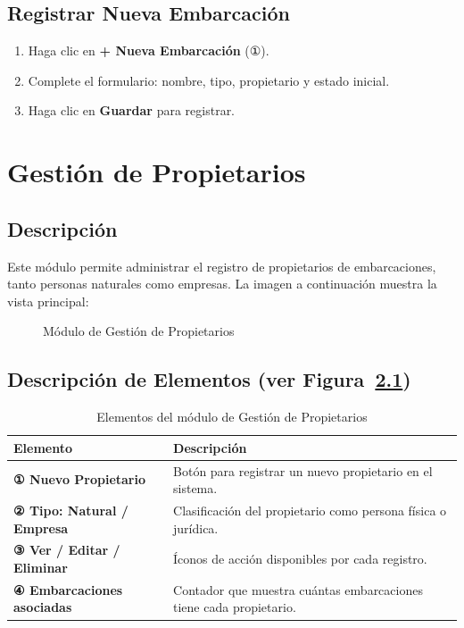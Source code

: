 \documentclass[12pt,a4paper]{report}
\begin{document}
\section{Registrar Nueva Embarcación}

\begin{enumerate}
  \item Haga clic en \textbf{+ Nueva Embarcación} (①).
  \item Complete el formulario: nombre, tipo, propietario y estado inicial.
  \item Haga clic en \textbf{Guardar} para registrar.
\end{enumerate}

\chapter{Gestión de Propietarios}

\section{Descripción}

Este módulo permite administrar el registro de propietarios de embarcaciones, tanto personas naturales como empresas. La imagen a continuación muestra la vista principal:

\begin{figure}[H]
  \centering
  \fbox{\rule{0pt}{4cm}\hspace{10cm}}
  \caption{Módulo de Gestión de Propietarios}
  \label{fig:propietarios}
\end{figure}

\section{Descripción de Elementos (ver Figura~\ref{fig:propietarios})}

\begin{table}[H]
  \centering
  \renewcommand{\arraystretch}{1.4}
  \begin{tabularx}{\textwidth}{@{}L{5cm} X@{}}
    \toprule
    \textbf{Elemento} & \textbf{Descripción} \\
    \midrule
    \textbf{① Nuevo Propietario} & Botón para registrar un nuevo propietario en el sistema. \\
    \textbf{② Tipo: Natural / Empresa} & Clasificación del propietario como persona física o jurídica. \\
    \textbf{③ Ver / Editar / Eliminar} & Íconos de acción disponibles por cada registro. \\
    \textbf{④ Embarcaciones asociadas} & Contador que muestra cuántas embarcaciones tiene cada propietario. \\
    \bottomrule
  \end{tabularx}
  \caption{Elementos del módulo de Gestión de Propietarios}
\end{table}
\end{document}
